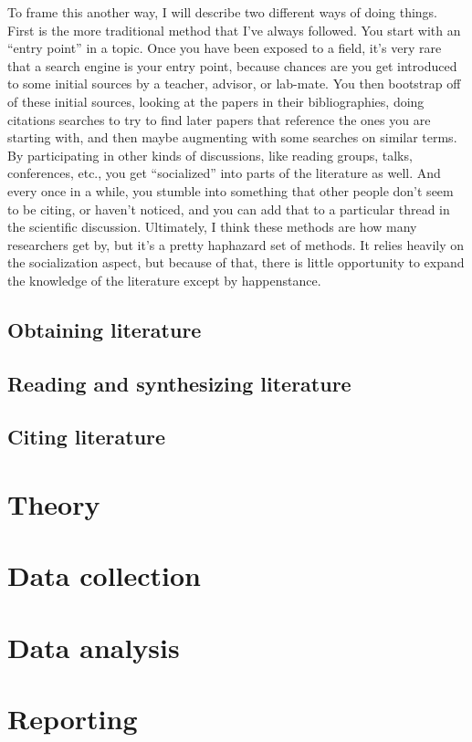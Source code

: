 \documentclass{book}
\begin{document}
To frame this another way, I will describe two different ways of doing things.  First is the more traditional method that I've always followed. You start with an ``entry point'' in a topic.  Once you have been exposed to a field, it's very rare that a search engine is your entry point, because chances are you get introduced to some initial sources by a teacher, advisor, or lab-mate.  You then bootstrap off of these initial sources, looking at the papers in their bibliographies, doing citations searches to try to find later papers that reference the ones you are starting with, and then maybe augmenting with some searches on similar terms.  By participating in other kinds of discussions, like reading groups, talks, conferences, etc., you get ``socialized'' into parts of the literature as well.  And every once in a while, you stumble into something that other people don't seem to be citing, or haven't noticed, and you can add that to a particular thread in the scientific discussion.  Ultimately, I think these methods are how many researchers get by, but it's a pretty haphazard set of methods.  It relies heavily on the socialization aspect, but because of that, there is little opportunity to expand the knowledge of the literature except by happenstance.
\section{Obtaining literature}
\label{sec-4-2}
\section{Reading and synthesizing literature}
\label{sec-4-3}
\section{Citing literature}
\label{sec-4-4}
\chapter{Theory}
\label{sec-5}
\label{theory}
\chapter{Data collection}
\label{sec-6}
\label{collection}
\chapter{Data analysis}
\label{sec-7}
\label{analysis}
\chapter{Reporting}
\label{sec-8}
\label{reporting}
\end{document}
